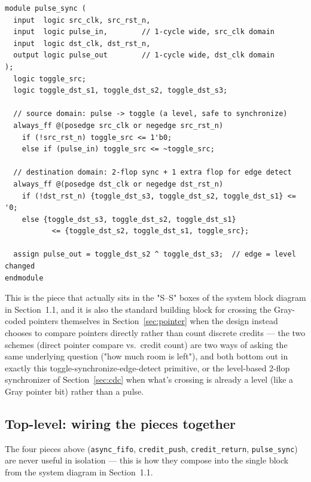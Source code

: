 \documentclass[12pt]{article}
\begin{document}
\begin{lstlisting}[style=sv,caption={Toggle-based pulse synchronizer: rclk pulse -> wclk pulse}]
module pulse_sync (
  input  logic src_clk, src_rst_n,
  input  logic pulse_in,        // 1-cycle wide, src_clk domain
  input  logic dst_clk, dst_rst_n,
  output logic pulse_out        // 1-cycle wide, dst_clk domain
);
  logic toggle_src;
  logic toggle_dst_s1, toggle_dst_s2, toggle_dst_s3;

  // source domain: pulse -> toggle (a level, safe to synchronize)
  always_ff @(posedge src_clk or negedge src_rst_n)
    if (!src_rst_n) toggle_src <= 1'b0;
    else if (pulse_in) toggle_src <= ~toggle_src;

  // destination domain: 2-flop sync + 1 extra flop for edge detect
  always_ff @(posedge dst_clk or negedge dst_rst_n)
    if (!dst_rst_n) {toggle_dst_s3, toggle_dst_s2, toggle_dst_s1} <= '0;
    else {toggle_dst_s3, toggle_dst_s2, toggle_dst_s1}
           <= {toggle_dst_s2, toggle_dst_s1, toggle_src};

  assign pulse_out = toggle_dst_s2 ^ toggle_dst_s3;  // edge = level changed
endmodule
\end{lstlisting}

This is the piece that actually sits in the "S--S" boxes of the system
block diagram in Section~1.1, and it is also the standard building block
for crossing the Gray-coded pointers themselves in Section~\ref{sec:pointer}
when the design instead chooses to compare pointers directly rather than
count discrete credits — the two schemes (direct pointer compare vs.\
credit count) are two ways of asking the same underlying question
("how much room is left"), and both bottom out in exactly this
toggle-synchronize-edge-detect primitive, or the level-based 2-flop
synchronizer of Section~\ref{sec:cdc} when what's crossing is already a
level (like a Gray pointer bit) rather than a pulse.

\subsection{Top-level: wiring the pieces together}

The four pieces above (\texttt{async\_fifo}, \texttt{credit\_push},
\texttt{credit\_return}, \texttt{pulse\_sync}) are never useful in
isolation — this is how they compose into the single block from the
system diagram in Section~1.1.
\end{document}
